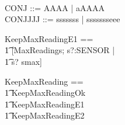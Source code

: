 \documentclass{article}
\begin{document}
\begin{zed}
[SENSOR] \\
CONJ ::= AAAA | aAAAA \\
CONJJJJ ::= sssssss | ssssssseee
\end{zed}



\begin{zed}
KeepMaxReadingE1 == \\
  \t1 [\Xi MaxReadings; s?:SENSOR | \\
  \t1 s? \notin \dom smax]
\end{zed}


\begin{zed}
KeepMaxReading == \\
  \t1 KeepMaxReadingOk \\
  \t1 \lor KeepMaxReadingE1 \\
  \t1 \lor KeepMaxReadingE2
\end{zed}
\end{document}
